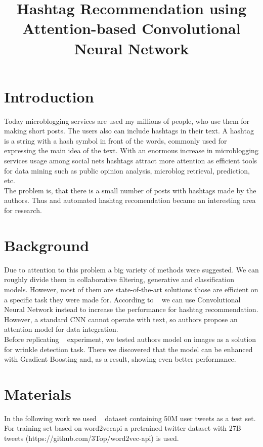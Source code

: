 \documentclass[jou,apacite]{apa6}
\title{Hashtag Recommendation using Attention-based Convolutional Neural Network}
\begin{document}
\maketitle    




\section{Introduction}
Today microblogging services are used my millions of people, who use them for making short posts. The users also can include hashtags in their text. A hashtag is a string with a hash symbol in front of the words, commonly used for expressing the main idea of the text. With an enormous increase in microblogging services usage among social nets hashtags attract more attention as efficient tools for data mining such as public opinion analysis, microblog retrieval, prediction, etc. \\
The problem is, that there is a small number of posts with hashtags made by the authors. Thus and automated hashtag recomendation became an interesting area for research.\\

\section{Background}
Due to attention to this problem a big variety of methods were suggested. We can roughly divide them in collaborative filtering, generative and classification models. However, most of them are state-of-the-art solutions those are efficient on a specific task they were made for. According to ~\cite{Gong} we can use Convolutional Neural Network instead to increase the performance for hashtag recommendation. However, a standard CNN cannot operate with text, so authors propose an attention model for data integration.   \\ 
Before replicating ~\cite{Gong} experiment, we tested authors model on images as a solution for wrinkle detection task. There we discovered that the model can be enhanced with Gradient Boosting and, as a result, showing even better performance.


\section{Materials}
In the following work we used ~\cite{DBLP} dataset containing 50M user tweets as a test set. For training set based on word2vecapi a pretrained twitter dataset with 27B tweets (https://github.com/3Top/word2vec-api)  is used.
\end{document}
